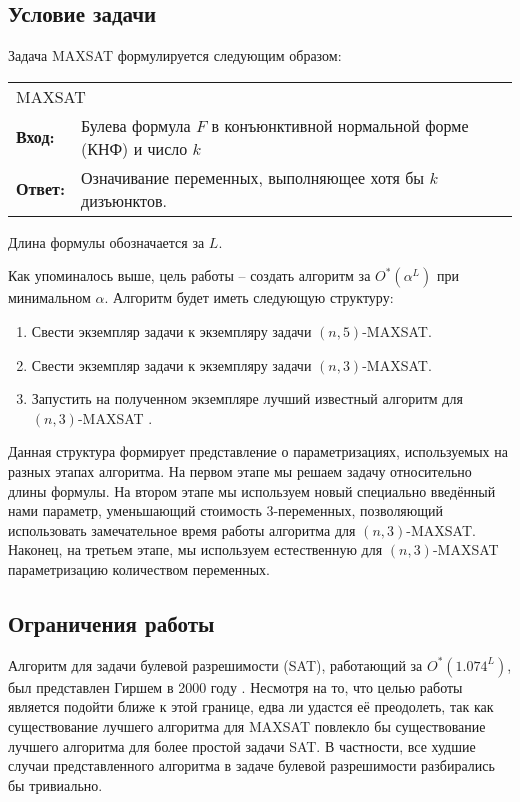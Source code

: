 \subsection*{Условие задачи}

\firstpar{}Задача MAXSAT формулируется следующим образом:

\begin{center}
 \begin{tabular}{|lp{}|}
  \hline
  \multicolumn{2}{|l|}{MAXSAT} \\
  \textbf{Вход:} & Булева формула $F$ в конъюнктивной нормальной форме (КНФ) и число $k$ \\
  \textbf{Ответ:} & Означивание переменных, выполняющее хотя бы $k$ дизъюнктов. \\
  \hline
 \end{tabular}
\end{center}

Длина формулы обозначается за $L$.

Как упоминалось выше, цель работы -- создать алгоритм за $O^*(\alpha^L)$ при минимальном $\alpha$.
Алгоритм будет иметь следующую структуру:

\begin{enumerate}
 \item Свести экземпляр задачи к экземпляру задачи $(n,5)$-MAXSAT.
 
 \item Свести экземпляр задачи к экземпляру задачи $(n,3)$-MAXSAT.

 \item Запустить на полученном экземпляре лучший известный алгоритм для $(n,3)$-MAXSAT \cite{belova18}.
\end{enumerate}

Данная структура формирует представление о параметризациях, используемых на разных этапах алгоритма. На первом этапе мы решаем задачу относительно длины формулы. На втором этапе мы используем новый специально введённый нами параметр, уменьшающий стоимость 3-переменных, позволяющий использовать замечательное время работы алгоритма для $(n,3)$-MAXSAT. Наконец, на третьем этапе, мы используем естественную для $(n,3)$-MAXSAT параметризацию количеством переменных.

\subsection*{Ограничения работы}

\firstpar{}Алгоритм для задачи булевой разрешимости (SAT), работающий за $O^*(1.074^L)$, был представлен Гиршем в 2000 году \cite{hirsch2000new}. Несмотря на то, что целью работы является подойти ближе к этой границе, едва ли удастся её преодолеть, так как существование лучшего алгоритма для MAXSAT повлекло бы существование лучшего алгоритма для более простой задачи SAT. В частности, все худшие случаи представленного алгоритма в задаче булевой разрешимости разбирались бы тривиально.

